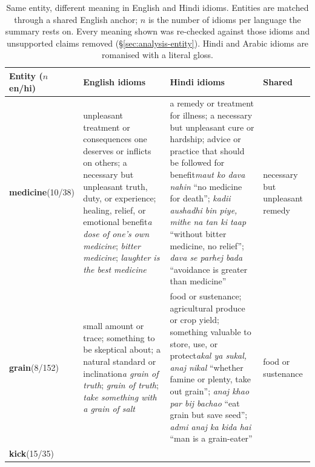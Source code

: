 \begin{table}[t]
\centering
\footnotesize
\setlength{\tabcolsep}{4pt}
\renewcommand{\arraystretch}{1.12}
\caption{Same entity, different meaning in \textcolor{encolor}{English} and \textcolor{encolor}{Hindi} idioms. Entities are matched through a shared English anchor; $n$ is the number of idioms per language the summary rests on. Every meaning shown was re-checked against those idioms and unsupported claims removed (\S\ref{sec:analysis-entity}). Hindi and Arabic idioms are romanised with a literal gloss. }
\label{tab:entity-cases-enhi}
\begin{tabular}{@{}p{}p{}p{}p{}@{}}
\toprule
Entity ($n$ en/hi) & \textcolor{encolor}{English idioms} & \textcolor{encolor}{Hindi idioms} & Shared \\
\midrule
\textbf{medicine}\newline (10/38)
& \textcolor{encolor}{unpleasant treatment or consequences one deserves or inflicts on others; a necessary but unpleasant truth, duty, or experience; healing, relief, or emotional benefit}\newline \textit{a dose of one’s own medicine}; \textit{bitter medicine}; \textit{laughter is the best medicine}
& \textcolor{encolor}{a remedy or treatment for illness; a necessary but unpleasant cure or hardship; advice or practice that should be followed for benefit}\newline \textit{maut ko dava nahin} ``no medicine for death''; \textit{kadii aushadhi bin piye, mithe na tan ki taap} ``without bitter medicine, no relief''; \textit{dava se parhej bada} ``avoidance is greater than medicine''
& necessary but unpleasant remedy \\
\textbf{grain}\newline (8/152)
& \textcolor{encolor}{small amount or trace; something to be skeptical about; a natural standard or inclination}\newline \textit{a grain of truth}; \textit{grain of truth}; \textit{take something with a grain of salt}
& \textcolor{encolor}{food or sustenance; agricultural produce or crop yield; something valuable to store, use, or protect}\newline \textit{akal ya sukal, anaj nikal} ``whether famine or plenty, take out grain''; \textit{anaj khao par bij bachao} ``eat grain but save seed''; \textit{admi anaj ka kida hai} ``man is a grain-eater''
& food or sustenance \\
\textbf{kick}\newline (15/35)

\end{tabular}
\end{table}
